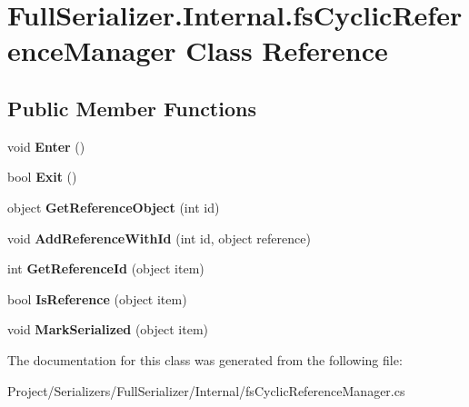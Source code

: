 \hypertarget{class_full_serializer_1_1_internal_1_1fs_cyclic_reference_manager}{}\section{Full\+Serializer.\+Internal.\+fs\+Cyclic\+Reference\+Manager Class Reference}
\label{class_full_serializer_1_1_internal_1_1fs_cyclic_reference_manager}
\subsection*{Public Member Functions}
\begin{DoxyCompactItemize}
\item 
\mbox{\label{class_full_serializer_1_1_internal_1_1fs_cyclic_reference_manager_a098112209466ccdf11e61c8f81f8b0e5}} 
void {\bfseries Enter} ()
\item 
\mbox{\label{class_full_serializer_1_1_internal_1_1fs_cyclic_reference_manager_ad9a0ff84732df338936a032c568bc182}} 
bool {\bfseries Exit} ()
\item 
\mbox{\label{class_full_serializer_1_1_internal_1_1fs_cyclic_reference_manager_a772758af872d1c63827878d587389dda}} 
object {\bfseries Get\+Reference\+Object} (int id)
\item 
\mbox{\label{class_full_serializer_1_1_internal_1_1fs_cyclic_reference_manager_aa27a4abcf40a5523a564a6db7cbccd5d}} 
void {\bfseries Add\+Reference\+With\+Id} (int id, object reference)
\item 
\mbox{\label{class_full_serializer_1_1_internal_1_1fs_cyclic_reference_manager_a2bc5dca49f4803c94ae2865891652fbb}} 
int {\bfseries Get\+Reference\+Id} (object item)
\item 
\mbox{\label{class_full_serializer_1_1_internal_1_1fs_cyclic_reference_manager_a6b65d1c5f70cf7b2c3ed5602e1173c88}} 
bool {\bfseries Is\+Reference} (object item)
\item 
\mbox{\label{class_full_serializer_1_1_internal_1_1fs_cyclic_reference_manager_a3dc671b9811d57d107fbd567b6d2a957}} 
void {\bfseries Mark\+Serialized} (object item)
\end{DoxyCompactItemize}


The documentation for this class was generated from the following file\+:\begin{DoxyCompactItemize}
\item 
Project/\+Serializers/\+Full\+Serializer/\+Internal/fs\+Cyclic\+Reference\+Manager.\+cs\end{DoxyCompactItemize}
